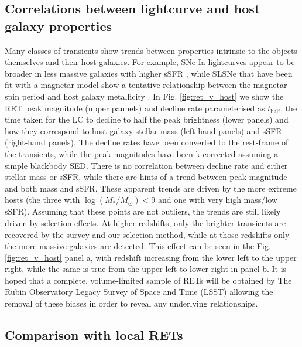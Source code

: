 \documentclass[fleqn,usenatbib,]{mnras}
\begin{document}
\subsection{Correlations between lightcurve and host galaxy properties \label{subsec:disc_correlations}}
Many classes of transients show trends between properties intrinsic to the objects themselves and their host galaxies. For example, SNe Ia lightcurves appear to be broader in less massive galaxies with higher sSFR \citep{Sullivan2006,Neill2009,Howell2009,Sullivan2010,Roman2018,Kelsey2020}, while SLSNe that have been fit with a magnetar model show a tentative relationship between the magnetar spin period and host galaxy metallicity \citep{Chen2016a}. In Fig. \ref{fig:ret_v_host} we show the RET peak magnitude (upper pannels) and decline rate parameterised as $t_{\mathrm{half}}$, the time taken for the LC to decline to half the peak brightness (lower panels) and how they correspond to host galaxy stellar mass (left-hand panels) and sSFR (right-hand panels). The decline rates have been converted to the rest-frame of the transients, while the peak magnitudes have been k-corrected assuming a simple blackbody SED. There is no correlation between decline rate and either stellar mass or sSFR, while there are hints of a trend between peak magnitude and both mass and sSFR. These apparent trends are driven by the more extreme hosts (the three with $\log\left(M_*/M_{\odot}\right) < 9$ and one with very high mass/low sSFR). Assuming that these points are not outliers, the trends are still likely driven by selection effects. At higher redshifts, only the brighter transients are recovered by the survey and our selection method, while at those redshifts only the more massive galaxies are detected. This effect can be seen in the Fig. \ref{fig:ret_v_host} panel a, with redshift increasing from the lower left to the upper right, while the same is true from the upper left to lower right in panel b. It is hoped that a complete, volume-limited sample of RETs will be obtained by The Rubin Observatory Legacy Survey of Space and Time (LSST) allowing the removal of these biases in order to reveal any underlying relationships.

\subsection{Comparison with local RETs \label{subsec:disc_lowz}}
\end{document}
